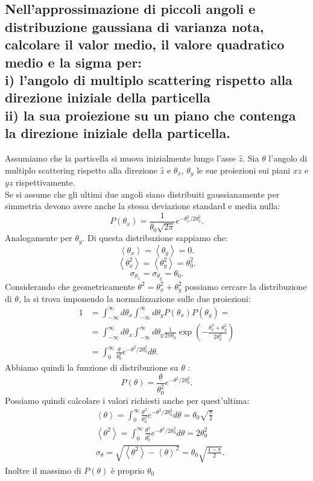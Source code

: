 \subsection[\hspace{1mm} Proprietà della distribuzione dell'angolo quadratico medio nel multiplo scattering]{Nell'approssimazione di piccoli angoli e distribuzione gaussiana di varianza nota, calcolare il valor medio, il valore quadratico medio e la sigma per:\\
i) l'angolo di multiplo scattering rispetto alla direzione iniziale della particella\\
ii) la sua proiezione su un piano che contenga la direzione iniziale della particella.
}
\label{sec:4.b.17}
Assumiamo che la particella si muova inizialmente lungo l'asse $\hat{z}$. Sia $\theta$ l'angolo di multiplo scattering rispetto alla direzione $\hat{z}$ e $\theta_{x}$, $\theta_{y}$ le sue proiezioni sui piani $xz$ e $yz$ rispettivamente.\\
Se si assume che gli ultimi due angoli siano distribuiti gaussianamente per simmetria devono avere anche la stessa deviazione standard e media nulla:
\[
	P\left( \theta_{x} \right) = \frac{1}{\theta_0 \sqrt{2\pi} } e^{- \theta^2_{x} / 2\theta_0^2}
.\] 
Analogamente per $\theta_{y}$. Di questa distribuzione sappiamo che:
\[
	\left<\theta_{x} \right> = \left<\theta_{y} \right> = 0
.\] 
\[
	\left<\theta_{x}^2 \right> = \left< \theta_{y}^2 \right> = \theta_0^2
.\] 
\[
	\sigma_{\theta_{x}} = \sigma_{\theta_{y}} = \theta_0
.\] 
Considerando che geometricamente $\theta^2 = \theta_{x}^2+\theta_{y}^2$ possiamo cercare la distribuzione di $\theta$, la si trova imponendo la normalizzazione sulle due proiezioni:
\begin{align*}
	1 &= \int_{-\infty}^{\infty}d\theta_{x} \int_{-\infty}^{\infty}d\theta_{y} P\left( \theta_{x} \right) P\left( \theta_{y} \right) =\\
	  &=  \int_{-\infty}^{\infty}d\theta_{x} \int_{-\infty}^{\infty}d\theta_{y}  \frac{1}{2\pi \theta_0} \exp\left( - \frac{\theta_{x}^2+\theta_{y}^2}{2\theta_0^2} \right) \\
	  &= \int_{0}^{\infty} \frac{\theta}{\theta_0^2} e^{- \theta^2 /2\theta_0^2} d\theta
.\end{align*}
Abbiamo quindi la funzione di distribuzione su $\theta$ :
\[
	P\left( \theta \right) = \frac{\theta}{\theta_0^2} e^{- \theta^2 /2\theta_0^2}
.\] 
Possiamo quindi calcolare i valori richiesti anche per quest'ultima:
\begin{align*}
	& \left<\theta \right> = \int_{0}^{\infty} \frac{\theta^2}{\theta_0^2} e^{- \theta^2 /2\theta_0^2} d\theta = \theta_0 \sqrt{\frac{\pi}{2}}\\
	& \left<\theta^2 \right> = \int_{0}^{\infty}\frac{\theta^3}{\theta_0^2} e^{- \theta^2 /2\theta_0^2} d\theta = 2 \theta_0^2 \\
	& \sigma_\theta = \sqrt{\left<\theta^2 \right>- \left< \theta \right>^2} =\theta_0 \sqrt{ \frac{4-\pi}{2}} 
.\end{align*}
Inoltre il massimo di $P\left( \theta \right)$ è proprio $\theta_0$

